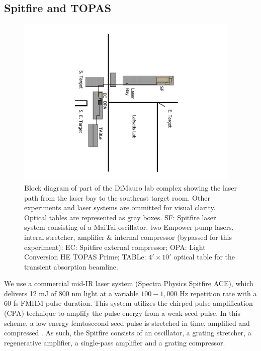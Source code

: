 \subsection{Spitfire and TOPAS}

\begin{figure}
	\centering
	\includegraphics[width=0.95\textwidth,angle=90]{figures/chap2/beam_routing2.pdf}
	\caption{Block diagram of part of the DiMauro lab complex showing the laser path from the laser bay to the southeast target room. Other experiments and laser systems are ommitted for visual clarity. Optical tables are represented as gray boxes. SF: Spitfire laser system consisting of a MaiTai oscillator, two Empower pump lasers, interal stretcher, amplifier \& internal compressor (bypassed for this experiment); EC: Spitfire external compressor; OPA: Light Conversion HE TOPAS Prime; TABLe: $4' \times 10'$ optical table for the transient absorption beamline.}
	\label{fig:beam_routing}
\end{figure}

We use a commercial mid-IR laser system (Spectra Physics Spitfire ACE), which delivers 12 mJ of 800 nm light at a variable $100 - 1,000$ Hz repetition rate with a 60 fs FMHM pulse duration. This system utilizes the chirped pulse amplification (CPA) technique to amplify the pulse energy from a weak seed pulse. In this scheme, a low energy femtosecond seed pulse is stretched in time, amplified and compressed \cite{stricklandCompressionAmplifiedChirped1985}. As such, the Spitfire consists of an oscillator, a grating stretcher, a regenerative amplifier, a single-pass amplifier and a grating compressor.

